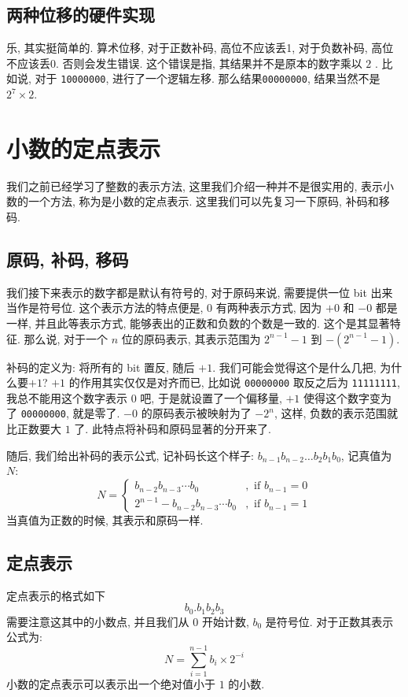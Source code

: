 \documentclass[12pt]{ctexart}
\theoremstyle{definition}
\theoremstyle{plain}
\begin{document}
\subsection{两种位移的硬件实现}
乐, 其实挺简单的. 
算术位移, 对于正数补码, 高位不应该丢1, 对于负数补码, 高位不应该丢0. 否则会发生错误.
这个错误是指, 其结果并不是原本的数字乘以 \(2\) . 比如说, 对于 \texttt{10000000}, 进行了一个逻辑左移. 
那么结果\texttt{00000000}, 结果当然不是 \(2 ^{7} \times 2\). 

\section{小数的定点表示}\label{sec:ding}
我们之前已经学习了整数的表示方法, 这里我们介绍一种并不是很实用的, 表示小数的一个方法, 称为是小数的定点表示. 这里我们可以先复习一下原码, 补码和移码. 
\subsection{原码, 补码, 移码}
我们接下来表示的数字都是默认有符号的, 对于原码来说, 需要提供一位 bit 出来当作是符号位. 这个表示方法的特点便是, \(0\) 有两种表示方式, 因为 \(+0\) 和 \(-0\) 都是一样, 并且此等表示方式, 能够表出的正数和负数的个数是一致的. 这个是其显著特征. 
那么说, 对于一个 \(n\) 位的原码表示, 其表示范围为 \(2^{n-1} - 1\) 到 \(-(2 ^{n-1} - 1)\).

补码的定义为: 将所有的 bit 置反, 随后 \(+1\). 我们可能会觉得这个是什么几把, 为什么要\(+1\)? \(+1\) 的作用其实仅仅是对齐而已, 比如说 \texttt{00000000} 取反之后为 \texttt{11111111}, 我总不能用这个数字表示 \(0\) 吧, 于是就设置了一个偏移量, \(+1\) 使得这个数字变为了 \texttt{00000000}, 就是零了. \(-0\) 的原码表示被映射为了 \(-2 ^{n}\), 这样, 负数的表示范围就比正数要大 \(1\) 了. 此特点将补码和原码显著的分开来了. 

随后, 我们给出补码的表示公式, 记补码长这个样子: \(b_{n-1}b_{n-2}\dots b_{2}b_{1}b_{0}\), 记真值为 \(N\): 
\begin{equation}
N = 
\begin{cases}
b_{n-2}b_{n-3}\cdots b_{0} &, \text{ if } b_{n-1} = 0\\
2 ^{n-1} - b _{n-2} b_{n-3} \cdots b_{0} &, \text{ if } b_{n-1} = 1
\end{cases}
\end{equation}
当真值为正数的时候, 其表示和原码一样. 
\subsection{定点表示}
定点表示的格式如下 
\begin{equation}
	b_{0}.b_{1}b_{2}b_{3}
\end{equation}
需要注意这其中的小数点, 并且我们从 \(0\) 开始计数, \(b_{0}\) 是符号位. 对于正数其表示公式为: 
\begin{equation}
	N = \sum_{i = 1 } ^{n-1} b_{i} \times 2^{-i}
\end{equation}
小数的定点表示可以表示出一个绝对值小于 \(1\) 的小数. 
\end{document}
